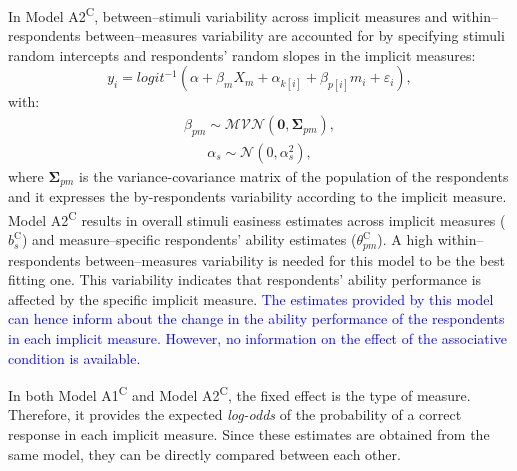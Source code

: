 \documentclass[12pt]{book}
\begin{document}
In Model A2\textsuperscript{C}, between--stimuli variability across implicit measures and within--respondents between--measures variability are accounted for by specifying stimuli random intercepts and respondents' random slopes in the implicit measures: 
%
\begin{equation}\label{eq:type1}
	y_{i} = logit^{-1}(\alpha + \beta_mX_m + \alpha_{k[i]} +  \beta_{p[i]}m_{i} + \varepsilon_{i}),
\end{equation}
with:
\begin{align}
	\beta_{pm} \sim \mathcal{MVN}(\bm{0}, \bm{\Sigma}_{pm}),
\end{align}
\begin{align}
	\alpha_s \sim \mathcal{N} (0, \alpha_s^2),
\end{align}
where $\bm{\Sigma}_{pm}$ is the variance-covariance matrix of the population of the respondents and it expresses the by-respondents variability according to the implicit measure. 
Model A2\textsuperscript{C} results in overall stimuli easiness estimates across implicit measures ($b_s^\text{C}$) and measure--specific respondents' ability estimates ($\theta_{pm}^\text{C}$). 
A high within--respondents between--measures variability is needed for this model to be the best fitting one. This variability indicates that respondents' ability performance is affected by the specific implicit measure. \textcolor{blue}{The estimates provided by this model can hence inform about the change in the ability performance of the respondents in each implicit measure. However, no information on the effect of the associative condition is available.} 

In both Model A1\textsuperscript{C} and Model A2\textsuperscript{C}, the fixed effect is the type of measure. Therefore, it provides the expected \emph{log-odds} of the probability of a correct response in each implicit measure. Since these estimates are obtained from the same model, they can be directly compared between each other.
\end{document}
